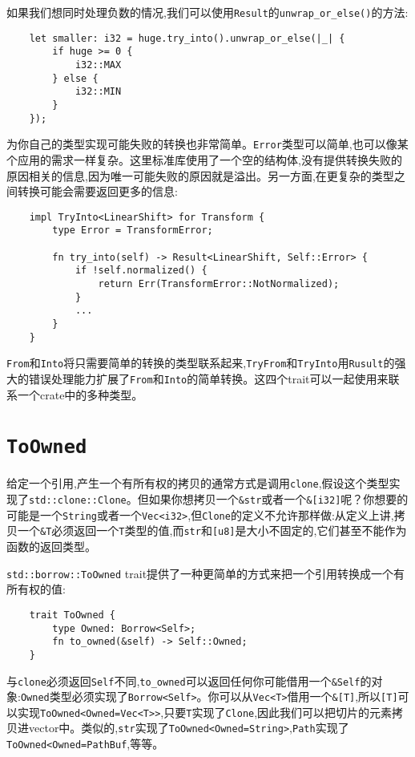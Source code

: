 如果我们想同时处理负数的情况,我们可以使用\texttt{Result}的\texttt{unwrap\_or\_else()}的方法:
\begin{verbatim}
    let smaller: i32 = huge.try_into().unwrap_or_else(|_| {
        if huge >= 0 {
            i32::MAX
        } else {
            i32::MIN
        }
    });
\end{verbatim}

为你自己的类型实现可能失败的转换也非常简单。\texttt{Error}类型可以简单,也可以像某个应用的需求一样复杂。这里标准库使用了一个空的结构体,没有提供转换失败的原因相关的信息,因为唯一可能失败的原因就是溢出。另一方面,在更复杂的类型之间转换可能会需要返回更多的信息:
\begin{verbatim}
    impl TryInto<LinearShift> for Transform {
        type Error = TransformError;

        fn try_into(self) -> Result<LinearShift, Self::Error> {
            if !self.normalized() {
                return Err(TransformError::NotNormalized);
            }
            ...
        }
    }
\end{verbatim}

\texttt{From}和\texttt{Into}将只需要简单的转换的类型联系起来,\texttt{TryFrom}和\texttt{TryInto}用\texttt{Rusult}的强大的错误处理能力扩展了\texttt{From}和\texttt{Into}的简单转换。这四个trait可以一起使用来联系一个crate中的多种类型。

\section{\texttt{ToOwned}}\label{toowned}

给定一个引用,产生一个有所有权的拷贝的通常方式是调用\texttt{clone},假设这个类型实现了\texttt{std::clone::Clone}。但如果你想拷贝一个\texttt{\&str}或者一个\texttt{\&[i32]}呢？你想要的可能是一个\texttt{String}或者一个\texttt{Vec<i32>},但\texttt{Clone}的定义不允许那样做:从定义上讲,拷贝一个\texttt{\&T}必须返回一个\texttt{T}类型的值,而\texttt{str}和\texttt{[u8]}是大小不固定的,它们甚至不能作为函数的返回类型。

\texttt{std::borrow::ToOwned} trait提供了一种更简单的方式来把一个引用转换成一个有所有权的值:
\begin{verbatim}
    trait ToOwned {
        type Owned: Borrow<Self>;
        fn to_owned(&self) -> Self::Owned;
    }
\end{verbatim}

与\texttt{clone}必须返回\texttt{Self}不同,\texttt{to\_owned}可以返回任何你可能借用一个\texttt{\&Self}的对象:\texttt{Owned}类型必须实现了\texttt{Borrow<Self>}。你可以从\texttt{Vec<T>}借用一个\texttt{\&[T]},所以\texttt{[T]}可以实现\texttt{ToOwned<Owned=Vec<T>>},只要\texttt{T}实现了\texttt{Clone},因此我们可以把切片的元素拷贝进vector中。类似的,\texttt{str}实现了\texttt{ToOwned<Owned=String>},\texttt{Path}实现了\texttt{ToOwned<Owned=PathBuf},等等。


